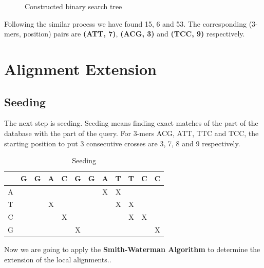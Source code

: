 \documentclass[12pt, a4paper]{report}
\begin{document}
 \begin{figure}[h]
     \centering
        \caption{Constructed binary search tree}
        \label{fig:Tree}
    \end{figure}

Following the similar process we have found 15, 6 and 53. The corresponding (3-mers, position) pairs are \textbf{(ATT, 7)}, \textbf{(ACG, 3)} and \textbf{(TCC, 9)} respectively. \\

\section{Alignment Extension}

\subsection{Seeding}
The next step is seeding. Seeding means finding exact matches of the part of the database with the part of the query. For 3-mers ACG, ATT, TTC and TCC, the starting position to put 3 consecutive crosses are 3, 7, 8 and 9 respectively. \\ 
\newpage
\begin{table}[h]
    \centering
    \begin{tabular}{| c | c | c | c | c | c | c | c | c | c | c | c |}
        \hline
         & G & G & A & C   &   G   &   G   &   A   &   T   &   T   &   C   &   C  \\
        \hline
        A &  &   &  &   &  &   &   X   &   X   &    &   &   \\
        \hline
        T &  &   & X &   &  &   &   &   X   & X   &   &   \\
        \hline
        C &  &   &  & X  &  &   &    &   &  X  & X  &   \\
        \hline
        G &  &   &  &   & X &   &    &    &    &   &  X \\
        \hline
    \end{tabular}
    \caption{Seeding}
    \label{tab:4}
\end{table}
Now we are going to apply the \textbf{Smith-Waterman Algorithm} to determine the extension of the local alignments.. \\
\end{document}
